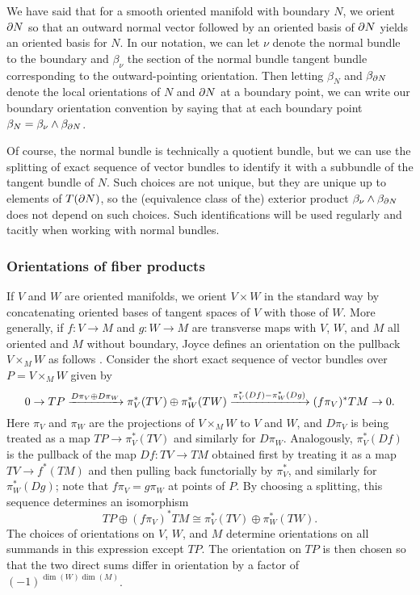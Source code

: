 \begin{example}
	We have said that for a smooth oriented manifold with boundary $N$, we orient $\partial N$ so that an outward normal vector followed by an oriented basis of $\partial N$ yields an oriented basis for $N$.
	In our notation, we can let $\nu$ denote the normal bundle to the boundary and $\beta_{\nu}$ the section of the normal bundle tangent bundle corresponding to the outward-pointing orientation.
	Then letting $\beta_N$ and $\beta_{\partial N}$ denote the local orientations of $N$ and $\partial N$ at a boundary point, we can write our boundary orientation convention by saying that at each boundary point $\beta_N=\beta_\nu\wedge \beta_{\partial N}$.

	Of course, the normal bundle is technically a quotient bundle, but we can use the splitting of exact sequence of vector bundles \cite[Theorem 3.9.6]{Hus75} to identify it with a subbundle of the tangent bundle of $N$.
	Such choices are not unique, but they are unique up to elements of $T(\partial N)$, so the (equivalence class of the) exterior product $\beta_\nu\wedge \beta_{\partial N}$ does not depend on such choices.
	Such identifications will be used regularly and tacitly when working with normal bundles.
\end{example}

\subsubsection{Orientations of fiber products}\label{S: orientation of fiber products}

If $V$ and $W$ are oriented manifolds, we orient $V \times W$ in the standard way by concatenating oriented bases of tangent spaces of $V$ with those of $W$.
More generally, if $f \colon V \to M$ and $g \colon W \to M$ are transverse maps with $V$, $W$, and $M$ all oriented and $M$ without boundary, Joyce defines an orientation on the pullback $V \times_M W$ as follows \cite[Convention 7.2b]{Joy12}.
Consider the short exact sequence of vector bundles over $P = V \times_M W$ given by
\begin{equation}\label{E: fiber orientation}
	0 \to TP \xrightarrow{D\pi_V \oplus D\pi_W} \pi_V^*(TV) \oplus \pi_W^*(TW) \xrightarrow{\pi_V^*(Df)-\pi_W^*(Dg)} (f\pi_V)^*TM \to 0.
\end{equation}
Here $\pi_V$ and $\pi_W$ are the projections of $V \times_M W$ to $V$ and $W$, and $D\pi_V$ is being treated as a map $TP \to \pi_V^*(TV)$ and similarly for $D\pi_W$.
Analogously, $\pi_V^*(Df)$ is the pullback of the map $Df \colon TV \to TM$ obtained first by treating it as a map $TV \to f^*(TM)$ and then pulling back functorially by $\pi_V^*$, and similarly for $\pi_W^*(Dg)$; note that $f\pi_V = g\pi_W$ at points of $P$.
By choosing a splitting, this sequence determines an isomorphism
\begin{equation*}
	TP \oplus (f\pi_V)^*TM\cong\pi_V^*(TV) \oplus \pi_W^*(TW).
\end{equation*}
The choices of orientations on $V$, $W$, and $M$ determine orientations on all summands in this expression except $TP$.
The orientation on $TP$ is then chosen so that the two direct sums differ in orientation by a factor of $(-1)^{\dim(W)\dim(M)}$.

